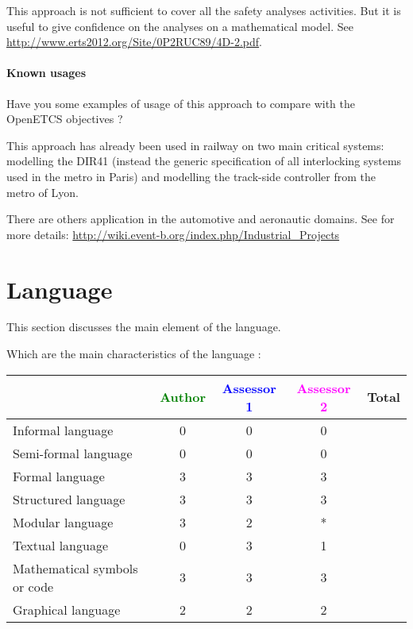 \begin{author_comment}
This approach is not sufficient to cover all the safety analyses activities. But it is useful to give confidence on the analyses on a mathematical model. See \url{http://www.erts2012.org/Site/0P2RUC89/4D-2.pdf}.
\end{author_comment}


\paragraph{Known usages} Have you some examples of usage of this approach to  compare with the OpenETCS objectives ?


\begin{author_comment}
This approach has already been used in railway on two  main critical systems: modelling the DIR41 (instead the generic specification of all interlocking systems used in the metro in Paris)  and modelling the track-side controller from the metro of Lyon. 

There are others application in the automotive and aeronautic domains. See for more details: \url{http://wiki.event-b.org/index.php/Industrial_Projects}
\end{author_comment}


\section{Language}
This section discusses the main element of the language.

Which are the main characteristics of the language :

\begin{tabular}{|l | c | c | c | c|}
\hline
& \textcolor{green}{Author} & \textcolor{blue}{Assessor 1} & \textcolor{magenta}{Assessor 2} & Total \\
\hline 
Informal language & 0 & 0 & 0 &  \\
\hline 
Semi-formal language & 0 & 0 & 0 &  \\
\hline
Formal language & 3 & 3 & 3 &  \\
\hline
Structured language & 3 & 3 & 3 & \\
\hline
Modular language & 3 & 2 & * & \\
\hline
Textual language & 0 & 3 & 1 & \\
\hline
Mathematical symbols or code & 3 & 3 & 3 & \\
\hline
Graphical language & 2 & 2 & 2 & \\
\hline
\end{tabular}

